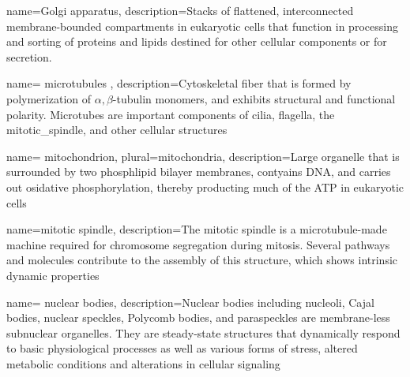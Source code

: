 

 {
	name={Golgi apparatus},
	description={Stacks of flattened, interconnected membrane-bounded compartments in eukaryotic cells that function in processing and sorting of proteins and lipids destined for other cellular components or for secretion.\cite{lodish2003molecular}}}



 {
	name= {microtubules} ,
	description={Cytoskeletal fiber that is formed by polymerization of $\alpha,\beta$-tubulin monomers, and exhibits structural and functional polarity. Microtubes are important components of cilia, flagella, the \gls{mitotic_spindle}, and other cellular structures\cite{lodish2003molecular}}}


 {
	name= {mitochondrion},
	plural={mitochondria},
	description={Large \gls{organelle} that is surrounded by two phosphlipid bilayer membranes, contyains DNA, and carries out osidative phosphorylation, thereby producting much of the \gls{ATP} in eukaryotic cells\cite{lodish2003molecular} }}


 {
	name={mitotic spindle},
	description={The mitotic spindle is a microtubule-made machine required for chromosome segregation during mitosis. Several pathways and molecules contribute to the assembly of this structure, which shows intrinsic dynamic properties\cite{bradshaw2015encyclopedia}}}

 {
	name= {nuclear bodies},
	description={Nuclear bodies including nucleoli, Cajal bodies, nuclear speckles, Polycomb bodies, and paraspeckles are membrane-less subnuclear organelles. They are steady-state structures that dynamically respond to basic physiological processes as well as various forms of stress, altered metabolic conditions and alterations in cellular signaling\cite{mao2011biogenesis}}}


